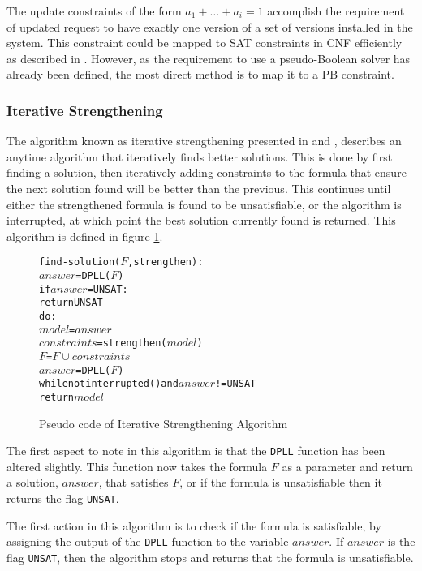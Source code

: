 The update constraints of the form $a_1 + \ldots + a_i = 1$ accomplish the requirement of updated request to have exactly one version of a set of versions installed in the system.
This constraint could be mapped to SAT constraints in CNF efficiently as described in \cite{silva2007}.
However, as the requirement to use a pseudo-Boolean solver has already been defined, the most direct method is to map it to a PB constraint.

\subsubsection{Iterative Strengthening}
The algorithm known as iterative strengthening presented in \cite{calistri1994iterative} and \cite{le2010sat4j}, 
describes an anytime algorithm that iteratively finds better solutions.
This is done by first finding a solution, then iteratively adding constraints to the formula that ensure the next solution found will be better than the previous.
This continues until either the strengthened formula is found to be unsatisfiable, or the algorithm is interrupted, at which point the best solution currently found is returned. 
This algorithm is defined in figure \ref{impl.strength}.

\begin{figure}[htp]
\begin{center}
\begin{alltt}
find-solution(\(F\),strengthen):
    \(answer\) = DPLL(\(F\))
    if \(answer\) = UNSAT:
        return UNSAT
    do:
        \(model\) = \(answer\)
        \(constraints\) = strengthen(\(model\))
        \(F\) = \(F \cup constraints\)
        \(answer\) = DPLL(\(F\))
    while not interrupted() and \(answer\) != UNSAT
    return \(model\) 
\end{alltt}
  \caption{Pseudo code of Iterative Strengthening Algorithm}
  \label{impl.strength}
\end{center}
\end{figure}

The first aspect to note in this algorithm is that the \verb+DPLL+ function has been altered slightly.
This function now takes the formula $F$ as a parameter and return a solution, $answer$, that satisfies $F$, 
or if the formula is unsatisfiable then it returns the flag \verb+UNSAT+.

The first action in this algorithm is to check if the formula is satisfiable, by assigning the output of the \verb+DPLL+ function to the variable $answer$.
If $answer$ is the flag \verb+UNSAT+, then the algorithm stops and returns that the formula is unsatisfiable.

